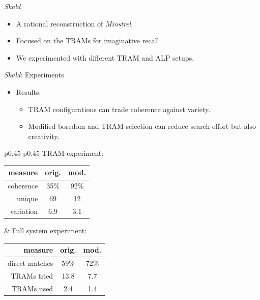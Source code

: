 \documentclass[xcolor=x11names]{beamer}
\def\minstrel/{\textit{Minstrel}}
\def\skald/{\textit{Skald}}
\begin{document}
\begin{frame}{\skald/}
  \vfill
  \begin{itemize}\addtolength{\itemsep}{0.5\baselineskip}
    \item A rational reconstruction of \minstrel/.
    \item Focused on the TRAMs for imaginative recall.
    \item We experimented with different TRAM and ALP setups.
  \end{itemize}
  \vfill
  \centering
  \tiny
\end{frame}

\begin{frame}{\skald/: Experiments}
  \begin{itemize}\addtolength{\itemsep}{0.5\baselineskip}
    \item Results:
    \begin{itemize}\addtolength{\itemsep}{0.5\baselineskip}
      \vspace{0.5\baselineskip}
      \item TRAM configurations can trade coherence against variety.
      \item Modified boredom and TRAM selection can reduce search effort but also creativity.
    \end{itemize}
  \end{itemize}
  \vspace{1ex}
  \begin{tabular}{p{} p{}}
  \scriptsize
  \centering
  TRAM experiment: \newline
  \begin{tabular}{r c c}
      \toprule
      measure & orig. & mod. \\
      \midrule
      coherence & 35\% & 92\%  \\
      unique & 69 & 12 \\
      variation & 6.9 & 3.1  \\
      \bottomrule
  \end{tabular}
  &
  \scriptsize
  \centering
  Full system experiment: \newline
  \begin{tabular}{r c c}
      \toprule
      measure & orig. & mod. \\
      \midrule
      direct matches & 59\% & 72\% \\
      TRAMs tried & 13.8 & 7.7  \\
      TRAMs used & 2.4 & 1.4  \\
      \bottomrule
  \end{tabular} \newline
\end{tabular}
  \vfill
  \centering
  \tiny
   \\
\end{frame}
\end{document}
